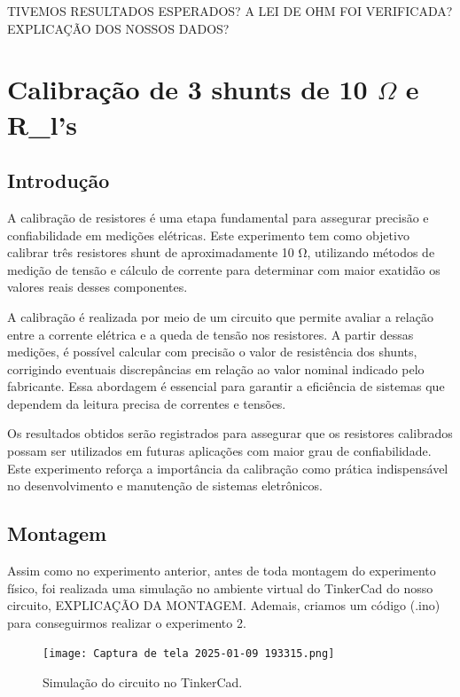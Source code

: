 \documentclass[a4paper,12pt]{article}
\begin{document}
TIVEMOS RESULTADOS ESPERADOS? A LEI DE OHM FOI VERIFICADA? EXPLICAÇÃO DOS NOSSOS DADOS?

\section{Calibração de 3 shunts de 10 $\Omega$ e R_l's}

\subsection{Introdução}
\leavevmode

A calibração de resistores é uma etapa fundamental para assegurar precisão e confiabilidade em medições elétricas. Este experimento tem como objetivo calibrar três resistores shunt de aproximadamente 10 Ω, utilizando métodos de medição de tensão e cálculo de corrente para determinar com maior exatidão os valores reais desses componentes.

A calibração é realizada por meio de um circuito que permite avaliar a relação entre a corrente elétrica e a queda de tensão nos resistores. A partir dessas medições, é possível calcular com precisão o valor de resistência dos shunts, corrigindo eventuais discrepâncias em relação ao valor nominal indicado pelo fabricante. Essa abordagem é essencial para garantir a eficiência de sistemas que dependem da leitura precisa de correntes e tensões.

Os resultados obtidos serão registrados para assegurar que os resistores calibrados possam ser utilizados em futuras aplicações com maior grau de confiabilidade. Este experimento reforça a importância da calibração como prática indispensável no desenvolvimento e manutenção de sistemas eletrônicos.

\subsection{Montagem}
\leavevmode

Assim como no experimento anterior, antes de toda montagem do experimento físico, foi realizada uma simulação no ambiente virtual do TinkerCad do nosso circuito, EXPLICAÇÃO DA MONTAGEM. Ademais, criamos um código (.ino) para conseguirmos realizar o experimento 2.

\vspace{1em}

\begin{figure}[H]
    \centering
    \texttt{[image: Captura de tela 2025-01-09 193315.png]} %
    \caption{Simulação do circuito no TinkerCad.}
    \label{fig:tinkercad}
\end{figure}
\end{document}
